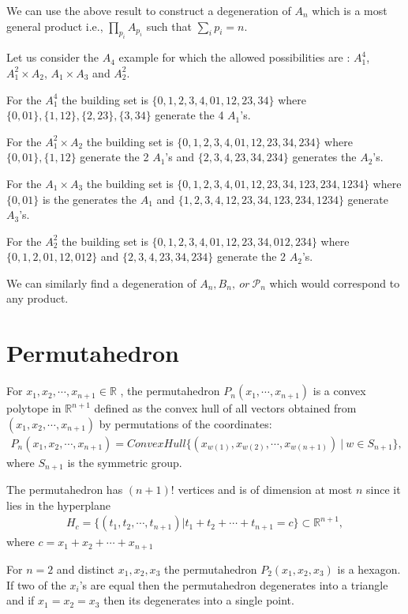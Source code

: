 \documentclass[hidelinks,12pt]{article}
\newcommand{\bea}[1]{\begin{eqnarray}\label{#1} }
\newcommand{\eea}{\end{eqnarray}}
\def\bea{\begin{eqnarray}}
\def\eea{\end{eqnarray}}
\begin{document}
We can use the above result to construct 	a degeneration of $A_n$ which is a most general product i.e., $\prod_{p_i} A_{p_i}$ such that $\sum_{i} p_{i} = n$. 

Let us consider the  $A_4$ example for which the allowed possibilities are : $A_1^{4}$, $A_1^2 \times A_2$, $A_1 \times A_3$ and $A^{2}_2$.
 
For the $A_1^{4}$ the building set is $ \{ {0},{1},{2},{3},{4},{01},{12},{23},{34} \}$ where $\{0,01\} , \{1,12\},\{2,23\},\{3,34\}$ generate the 4 $A_1$'s.

For the $A_1^{2} \times A_2$ the building set is $ \{ {0},{1},{2},{3},{4},{01},{12},{23},{34},{234} \}$ where $\{0,01\} , \{1,12\} $ generate the 2 $A_1$'s and $\{2,3,4,23,34,234\}$ generates the $A_2$'s.

For the $A_1 \times A_3$ the building set is $ \{ {0},{1},{2},{3},{4},{01},{12},{23},{34},{123},{234},{1234} \}$ where $\{0,01\}$ is the generates the $A_1$ and $\{{1},{2},{3},{4},{12},{23},{34},{123},{234},{1234} \}$ generate  $A_3$'s.

For the $A_2^{2}$ the building set is $ \{ {0},{1},{2},{3},{4},{01},{12},{23},{34} ,{012},{234}\}$ where $\{0,1,2,01,12,012\}$  and $\{2,3,4,23,34,234\}$ generate the 2 $A_2$'s.

We can similarly find a degeneration of $A_n,B_n,~or~ {\mathscr P_n}$ which would correspond to any product.







\section*{Permutahedron}
 For $x_1,x_2, \cdots, x_{n+1} \in \mathbb{R} $ , the permutahedron $P_n(x_1,\cdots,x_{n+1})$ is a convex polytope in $\mathbb{R}^{n+1}$ defined as the convex hull of all vectors obtained from $(x_1,x_2, \cdots, x_{n+1})$ by permutations of the coordinates:
 \bea
 P_n(x_1,x_2, \cdots, x_{n+1}) = ConvexHull \{ (x_{w(1)},x_{w(2)}, \cdots, x_{w(n+1)})~ |~ w \in S_{n+1} \}, \nonumber
 \eea
 where $S_{n+1}$ is the symmetric group. 
 
 The permutahedron has $(n+1)!$ vertices and is of dimension at most $n$ since it lies in the hyperplane 
 \bea
 H_c= \{(t_1,t_2, \cdots, t_{n+1}) | t_1 + t_2 + \cdots + t_{n+1}= c \} \subset \mathbb{R}^{n+1}, \nonumber
 \eea
where $c= x_1+x_2+ \cdots +x_{n+1}$

For $n=2$ and distinct $x_1,x_2, x_3$ the permutahedron $P_2(x_1,x_2, x_3)$ is a hexagon. If two of the $x_i$'s are equal then the permutahedron degenerates into a triangle and if $x_1= x_2 = x_3$ then its degenerates into a single point.
\end{document}
